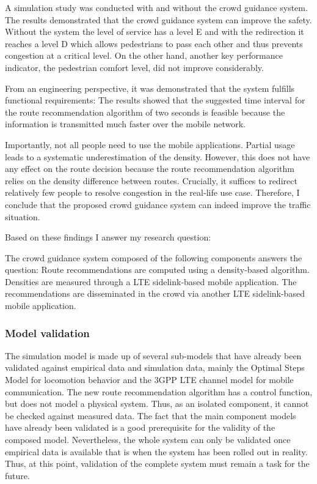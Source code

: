 A simulation study was conducted with and without the crowd guidance system. 
The results demonstrated that the crowd guidance system can improve the safety. Without the system the level of service has a level E and with the redirection it reaches a level D which allows pedestrians to pass each other and thus prevents congestion at a critical level. 
On the other hand, another key performance indicator, the pedestrian comfort level, did not improve considerably.

From an engineering perspective, it was demonstrated that the system fulfills functional requirements:
The results showed that the suggested time interval for the route recommendation algorithm of two seconds is feasible because the information is transmitted much faster over the mobile network. 


Importantly, not all people need to use the mobile applications. Partial usage leads to a systematic underestimation of the density. However, this does not have any effect on the route decision because the route recommendation algorithm relies on the density difference between routes. Crucially, it suffices to redirect relatively few people to resolve congestion in the real-life use case. Therefore, I conclude that the proposed crowd guidance system can indeed improve the traffic situation. 

\newpage

Based on these findings I answer my research question:



\begin{tcolorbox}[title=How can crowds be redirected through mobile applications based on direct communication technologies? (RQ)]
The crowd guidance system composed of the following components answers the question: Route recommendations are computed using a density-based algorithm. Densities are measured through a LTE sidelink-based mobile application. The recommendations are disseminated in the crowd via another LTE sidelink-based mobile application.
\end{tcolorbox}


\subsubsection{Model validation}

The simulation model is made up of several sub-models that have already been validated against empirical data and simulation data, mainly the Optimal Steps Model for locomotion behavior and the 3GPP LTE channel model for mobile communication. The new route recommendation algorithm has a control function, but does not model a physical system. Thus, as an isolated component, it cannot be checked against measured data. The fact that the main component models have already been validated is a good prerequisite for the validity of the composed model. Nevertheless, the whole system can only be validated once empirical data is available that is when the system has been rolled out in reality. Thus, at this point, validation of the complete system must remain a task for the future.



